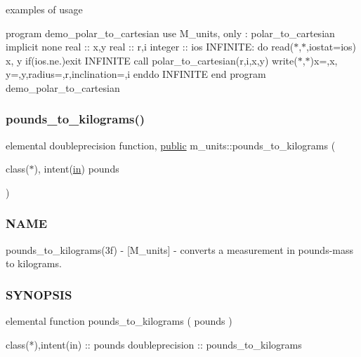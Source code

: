 examples of usage

program demo\+\_\+polar\+\_\+to\+\_\+cartesian use M\+\_\+units, only \+: polar\+\_\+to\+\_\+cartesian implicit none real \+:\+: x,y real \+:\+: r,i integer \+:\+: ios I\+N\+F\+I\+N\+I\+TE\+: do read($\ast$,$\ast$,iostat=ios) x, y if(ios.\+ne.)exit I\+N\+F\+I\+N\+I\+TE call polar\+\_\+to\+\_\+cartesian(r,i,x,y) write($\ast$,$\ast$)\textquotesingle{}x=\textquotesingle{},x,\textquotesingle{} y=\textquotesingle{},y,\textquotesingle{}radius=\textquotesingle{},r,\textquotesingle{}inclination=\textquotesingle{},i enddo I\+N\+F\+I\+N\+I\+TE end program demo\+\_\+polar\+\_\+to\+\_\+cartesian \mbox{\label{namespacem__units_a69c8b8d7b442cfbbe70fa384d96bebf0}} 
\subsubsection{\texorpdfstring{pounds\+\_\+to\+\_\+kilograms()}{pounds\_to\_kilograms()}}
{\footnotesize\ttfamily elemental doubleprecision function, \hyperlink{M__stopwatch_83_8txt_a2f74811300c361e53b430611a7d1769f}{public} m\+\_\+units\+::pounds\+\_\+to\+\_\+kilograms (\begin{DoxyParamCaption}\item[{class($\ast$), intent(\hyperlink{M__journal_83_8txt_afce72651d1eed785a2132bee863b2f38}{in})}]{pounds }\end{DoxyParamCaption})}



\subsubsection*{N\+A\+ME}

pounds\+\_\+to\+\_\+kilograms(3f) -\/ \mbox{[}M\+\_\+units\mbox{]} -\/ converts a measurement in pounds-\/mass to kilograms. 

\subsubsection*{S\+Y\+N\+O\+P\+S\+IS}

\begin{DoxyVerb}elemental function pounds_to_kilograms ( pounds )

 class(*),intent(in) ::  pounds
 doubleprecision     :: pounds_to_kilograms
\end{DoxyVerb}


